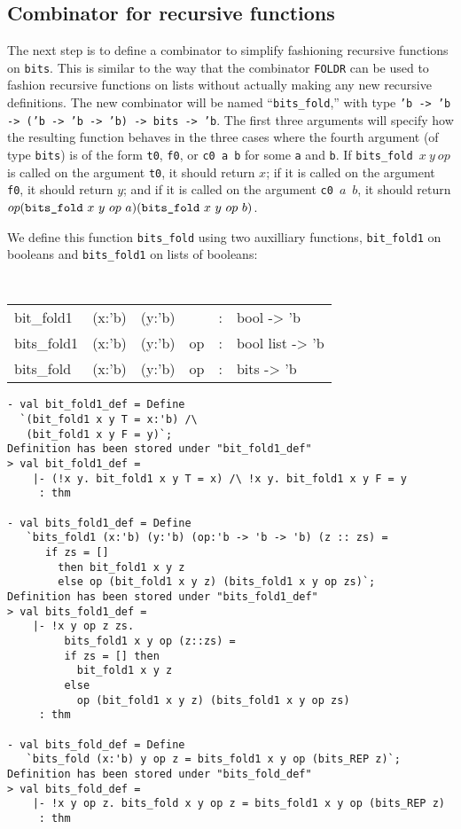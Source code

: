 \subsection{Combinator for recursive functions}

The next step is to define a combinator to simplify fashioning recursive
functions on \texttt{bits}.
This is similar to the way that the combinator \texttt{FOLDR} can be used to
fashion recursive functions on lists without actually making any new recursive
definitions.
The new combinator will be named
``\texttt{bits\_fold},'' with type
\texttt{'b -> 'b -> ('b -> 'b -> 'b) -> bits -> 'b}.
The first three arguments will specify how the resulting function behaves
in the three cases where the fourth argument (of type \texttt{bits})
is of the form
\texttt{t0}, \texttt{f0}, or \texttt{c0 a b} for some \texttt{a} and \texttt{b}.
If \texttt{bits\_fold}~$x\ y\ op$
is called on the argument \texttt{t0}, it should return $x$;
if it is called on the argument \texttt{f0}, it should return $y$;
and if it is called on the argument \texttt{c0}~$a$~$b$,
it should return
$op (\mbox{\texttt{bits\_fold}}\ x\ y\ op\ a)
    (\mbox{\texttt{bits\_fold}}\ x\ y\ op\ b)$.

We define this function \texttt{bits\_fold}
using two auxilliary functions,
\texttt{bit\_fold1} on booleans and \texttt{bits\_fold1} on lists of booleans:
%
\begin{center}
{\tt
\begin{tabular}{lccccl}
     bit\_fold1  & (x:'b) & (y:'b) &    & : & bool -> 'b \\
     bits\_fold1 & (x:'b) & (y:'b) & op & : & bool list -> 'b \\
     bits\_fold  & (x:'b) & (y:'b) & op & : & bits -> 'b
\end{tabular}
}
\end{center}

%
\begin{session}
\begin{verbatim}
- val bit_fold1_def = Define
  `(bit_fold1 x y T = x:'b) /\
   (bit_fold1 x y F = y)`;
Definition has been stored under "bit_fold1_def"
> val bit_fold1_def =
    |- (!x y. bit_fold1 x y T = x) /\ !x y. bit_fold1 x y F = y
     : thm

- val bits_fold1_def = Define
   `bits_fold1 (x:'b) (y:'b) (op:'b -> 'b -> 'b) (z :: zs) =
      if zs = []
        then bit_fold1 x y z
        else op (bit_fold1 x y z) (bits_fold1 x y op zs)`;
Definition has been stored under "bits_fold1_def"
> val bits_fold1_def =
    |- !x y op z zs.
         bits_fold1 x y op (z::zs) =
         if zs = [] then
           bit_fold1 x y z
         else
           op (bit_fold1 x y z) (bits_fold1 x y op zs)
     : thm

- val bits_fold_def = Define
   `bits_fold (x:'b) y op z = bits_fold1 x y op (bits_REP z)`;
Definition has been stored under "bits_fold_def"
> val bits_fold_def =
    |- !x y op z. bits_fold x y op z = bits_fold1 x y op (bits_REP z)
     : thm
\end{verbatim}
\end{session}

